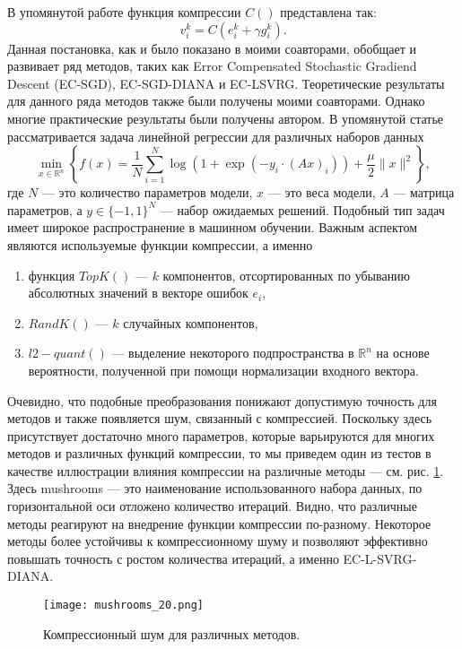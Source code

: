   В упомянутой работе функция компрессии $C()$ представлена так:
  $$
    v_i^k = C(e_i^k + \gamma g_i^k).
  $$
  Данная постановка, как и было показано в \cite{GorbunovKMR20} моими соавторами, обобщает и развивает ряд методов, таких как Error Compensated Stochastic Gradiend Descent (EC-SGD), EC-SGD-DIANA и EC-LSVRG. Теоретические результаты для данного ряда методов также были получены моими соавторами. Однако многие практические результаты были получены автором. В упомянутой статье рассматривается задача линейной регрессии для различных наборов данных
  $$
    \min_{x \in \mathbb{R}^n}\left\{ f(x) = \frac{1}{N} \sum_{i=1}^N \log \left(1+\exp \left(- y_i \cdot(A x)_i\right)\right) + \frac{\mu}{2}\|x\|^2 \right\},
  $$
  где $N$ --- это количество параметров модели, $x$ --- это веса модели, $A$ --- матрица параметров, а $y \in {\{-1,1\}}^N$ --- набор ожидаемых решений. Подобный тип задач имеет широкое распространение в машинном обучении. Важным аспектом являются используемые функции компрессии, а именно 
  \begin{enumerate}
    \item функция $TopK()$ --- $k$ компонентов, отсортированных по убыванию абсолютных значений в векторе ошибок $e_i$,
    \item $RandK()$ --- $k$ случайных компонентов,
    \item $l2-quant()$ --- выделение некоторого подпространства в $\mathbb{R}^n$ на основе вероятности, полученной при помощи нормализации входного вектора. 
  \end{enumerate}

  Очевидно, что подобные преобразования понижают допустимую точность для методов и также появляется шум, связанный с компрессией. Поскольку здесь присутствует достаточно много параметров, которые варьируются для многих методов и различных функций компрессии, то мы приведем один из тестов в качестве иллюстрации влияния компрессии на различные методы --- см. рис. \ref{compr}. Здесь mushrooms --- это наименование использованного набора данных, по горизонтальной оси отложено количество итераций. Видно, что различные методы реагируют на внедрение функции компрессии по-разному. Некоторое методы более устойчивы к компрессионному шуму и позволяют эффективно повышать точность с ростом количества итераций, а именно EC-L-SVRG-DIANA.
  \begin{figure}
    \begin{center}
      \texttt{[image: mushrooms\_20.png]}
    \end{center}
    \caption{Компрессионный шум для различных методов.}
    \label{compr}
  \end{figure}

